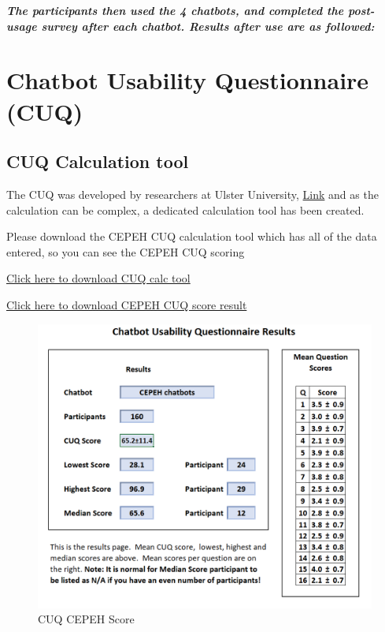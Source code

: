 \documentclass[a4paper, nobind]{templates/ociamthesis}
\begin{document}
\textbf{\emph{The participants then used the 4 chatbots, and completed the
post-usage survey after each chatbot. Results after use are as
followed:}}

\hypertarget{chatbot-usability-questionnaire-cuq-1}{%
\section{Chatbot Usability Questionnaire (CUQ)}\label{chatbot-usability-questionnaire-cuq-1}}

\hypertarget{cuq-calculation-tool}{%
\subsection{CUQ Calculation tool}\label{cuq-calculation-tool}}

The CUQ was developed by researchers at Ulster University,
\href{https://www.ulster.ac.uk/research/topic/computer-science/artificial-intelligence/projects/cuq}{Link}
and as the calculation can be complex, a dedicated calculation tool has
been created.

Please download the CEPEH CUQ calculation tool which has all of the data
entered, so you can see the CEPEH CUQ scoring

\href{CUQ-Calculation-Tool.xlsx}{Click here to download CUQ calc tool}

\href{cuq.png}{Click here to download CEPEH CUQ score result}

\begin{figure}

{\centering \includegraphics[width=0.75\linewidth]{cuq} 

}

\caption{CUQ CEPEH Score}\label{fig:cuqimage}
\end{figure}
\end{document}
